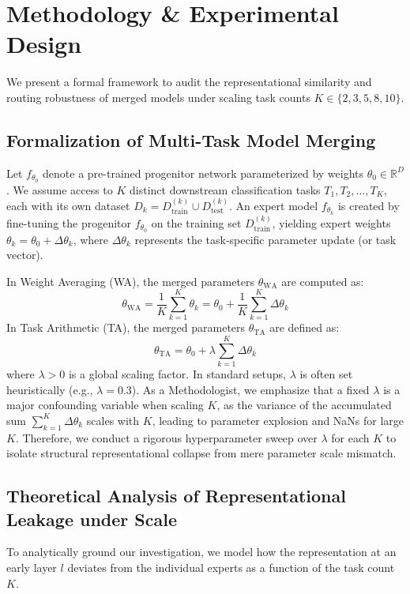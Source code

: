 \documentclass{article}
\theoremstyle{plain}
\theoremstyle{definition}
\theoremstyle{remark}
\begin{document}
\section{Methodology \& Experimental Design}
We present a formal framework to audit the representational similarity and routing robustness of merged models under scaling task counts $K \in \{2, 3, 5, 8, 10\}$.

\subsection{Formalization of Multi-Task Model Merging}
Let $f_{\theta_0}$ denote a pre-trained progenitor network parameterized by weights $\theta_0 \in \mathbb{R}^D$. We assume access to $K$ distinct downstream classification tasks $T_1, T_2, \dots, T_K$, each with its own dataset $D_k = D_{\text{train}}^{(k)} \cup D_{\text{test}}^{(k)}$. An expert model $f_{\theta_k}$ is created by fine-tuning the progenitor $f_{\theta_0}$ on the training set $D_{\text{train}}^{(k)}$, yielding expert weights $\theta_k = \theta_0 + \Delta \theta_k$, where $\Delta \theta_k$ represents the task-specific parameter update (or task vector).

In Weight Averaging (WA), the merged parameters $\theta_{\text{WA}}$ are computed as:
\begin{equation}
\theta_{\text{WA}} = \frac{1}{K} \sum_{k=1}^K \theta_k = \theta_0 + \frac{1}{K} \sum_{k=1}^K \Delta \theta_k
\end{equation}
In Task Arithmetic (TA), the merged parameters $\theta_{\text{TA}}$ are defined as:
\begin{equation}
\theta_{\text{TA}} = \theta_0 + \lambda \sum_{k=1}^K \Delta \theta_k
\end{equation}
where $\lambda > 0$ is a global scaling factor. In standard setups, $\lambda$ is often set heuristically (e.g., $\lambda = 0.3$). As a Methodologist, we emphasize that a fixed $\lambda$ is a major confounding variable when scaling $K$, as the variance of the accumulated sum $\sum_{k=1}^K \Delta \theta_k$ scales with $K$, leading to parameter explosion and NaNs for large $K$. Therefore, we conduct a rigorous hyperparameter sweep over $\lambda$ for each $K$ to isolate structural representational collapse from mere parameter scale mismatch.

\subsection{Theoretical Analysis of Representational Leakage under Scale}
To analytically ground our investigation, we model how the representation at an early layer $l$ deviates from the individual experts as a function of the task count $K$.
\end{document}
